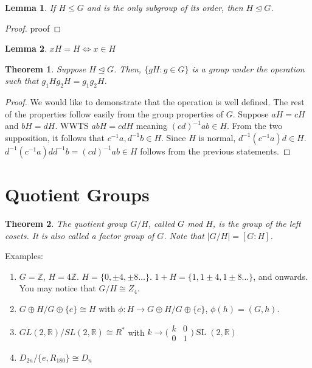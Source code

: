 \documentclass{article}
\theoremstyle{definition}
\theoremstyle{plain}
\newtheorem{theorem}{Theorem}
\theoremstyle{corollary}
\theoremstyle{lemma}
\newtheorem{lemma}{Lemma}
\DeclareMathOperator{\SL}{SL}
\begin{document}
\begin{lemma}
If $H\leq G$ and is the only subgroup of its order, then $H\unlhd G$.
\end{lemma}

\begin{proof}
    proof
\end{proof}

\begin{lemma}
$xH=H\iff x\in H$
\end{lemma}

\begin{theorem}
Suppose $H\unlhd G$. Then, $\{gH:g\in G\}$ is a group under the operation such that $g_1Hg_2H=g_1g_2H$.
\end{theorem}

\begin{proof}
We would like to demonstrate that the operation is well defined. The rest of the properties follow easily from the group properties of $G$.
Suppose $aH=cH$ and $bH=dH$. WWTS $abH=cdH$ meaning $(cd)^{-1}ab\in H$. From the two supposition, it follows that $c^{-1}a,d^{-1}b\in H$. Since $H$ is normal, $d^{-1}(c^{-1}a)d\in H$. $d^{-1}(c^{-1}a)dd^{-1}b=(cd)^{-1}ab\in H$ follows from the previous statements.
\end{proof}

\section{Quotient Groups}

\begin{theorem}
The quotient group $G/H$, called $G$ mod $H$, is the group of the left cosets. It is also called a factor group of $G$. Note that $|G/H|=[G:H]$.
\end{theorem}

Examples:
\begin{enumerate}
    \item $G=\mathbb{Z}$, $H=4\mathbb{Z}$. $H=\{0,\pm4,\pm8\dots\}$. $1+H=\{1,1\pm4,1\pm8\dots\}$, and onwards. You may notice that $G/H\cong Z_4$.
    \item $G\oplus H/G\oplus\{e\}\cong H$ with $\phi:H\rightarrow G\oplus H/G\oplus\{e\}$, $\phi(h)=(G,h)$.
    \item $GL(2,\mathbb{R})/SL(2,\mathbb{R})\cong R^*$ with $k\rightarrow\bigl(\begin{smallmatrix} k & 0\\0 &  1\end{smallmatrix}\bigr)\SL(2,\mathbb{R})$
    \item $D_{2n}/\{e,R_{180}\}\cong D_n$
\end{enumerate}
\end{document}
